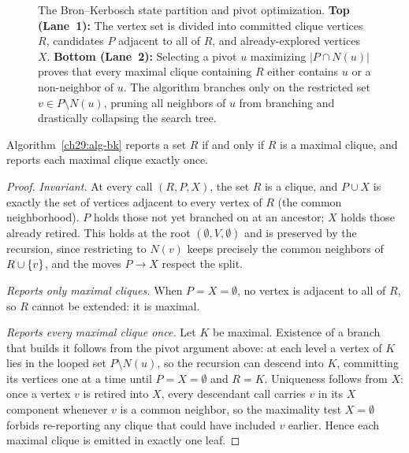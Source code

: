 \begin{figure}[H]
\caption{The Bron--Kerbosch state partition and pivot optimization. \textbf{Top (Lane~1):} The vertex set is divided into committed clique vertices $R$, candidates $P$ adjacent to all of $R$, and already-explored vertices $X$. \textbf{Bottom (Lane~2):} Selecting a pivot $u$ maximizing $|P\cap N(u)|$ proves that every maximal clique containing $R$ either contains $u$ or a non-neighbor of $u$. The algorithm branches only on the restricted set $v \in P \setminus N(u)$, pruning all neighbors of $u$ from branching and drastically collapsing the search tree.}
\label{ch29:fig-bk-pivot}
\end{figure}

\begin{lemma}
\label{ch29:lem-bk-correct}
Algorithm~\ref{ch29:alg-bk} reports a set $R$ if and only if $R$ is a maximal
clique, and reports each maximal clique exactly once.
\end{lemma}

\begin{proof}
\emph{Invariant.} At every call $(R,P,X)$, the set $R$ is a clique, and
$P\cup X$ is exactly the set of vertices adjacent to every vertex of $R$ (the
common neighborhood). $P$ holds those not yet branched on at an ancestor; $X$
holds those already retired. This holds at the root $(\emptyset,V,\emptyset)$ and
is preserved by the recursion, since restricting to $N(v)$ keeps precisely the
common neighbors of $R\cup\{v\}$, and the moves $P\to X$ respect the split.

\emph{Reports only maximal cliques.} When $P=X=\emptyset$, no vertex is adjacent
to all of $R$, so $R$ cannot be extended: it is maximal.

\emph{Reports every maximal clique once.} Let $K$ be maximal. Existence of a
branch that builds it follows from the pivot argument above: at each level a
vertex of $K$ lies in the looped set $P\setminus N(u)$, so the recursion can
descend into $K$, committing its vertices one at a time until $P=X=\emptyset$ and
$R=K$. Uniqueness follows from $X$: once a vertex $v$ is retired into $X$, every
descendant call carries $v$ in its $X$ component whenever $v$ is a common
neighbor, so the maximality test $X=\emptyset$ forbids re-reporting any clique
that could have included $v$ earlier. Hence each maximal clique is emitted in
exactly one leaf.
\end{proof}

